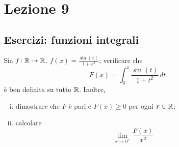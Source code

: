 \section{Lezione 9}
\subsection{Esercizi: funzioni integrali}
\begin{exercise}
    \label{ex:9.1}
    Sia $f\colon\amsbb{R}\to \amsbb{R}$, $f(x) = \frac{\sin(x)}{1+x^2}$; verificare che
    \[
    F(x) = \int_0^x \frac{\sin(t)}{1+t^2}\, dt
    \]
    è ben definita su tutto $\amsbb{R}$. Inoltre,
    \begin{enumerate}[(i)]
        \item dimostrare che $F$ è pari e $F(x)\ge 0$ per ogni $x\in\amsbb{R}$;
        \item calcolare 
        \[
        \lim_{x\to 0^+} \frac{F(x)}{x^2}
        \]
    \end{enumerate}
\end{exercise}
